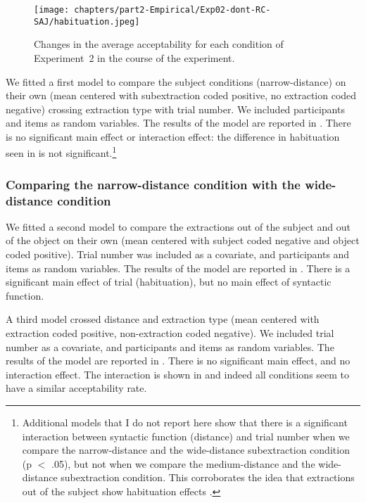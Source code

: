 \begin{figure}
    \centering
    \texttt{[image: chapters/part2-Empirical/Exp02-dont-RC-SAJ/habituation.jpeg]}
    \caption{Changes in the average acceptability for each condition of Experiment~2 in the course of the experiment.}
    \label{fig:exp02-habituation}
\end{figure}

We fitted a first model to compare the subject conditions (narrow-distance) on their own (mean centered with subextraction coded positive, no extraction coded negative) crossing extraction type with trial number. We included participants and items as random variables. The results of the model are reported in . 
There is no significant main effect or interaction effect: the difference in habituation seen in  is not significant.\footnote{Additional models that I do not report here show that there is a significant interaction between syntactic function (distance) and trial number when we compare the narrow-distance and the wide-distance subextraction condition (p $<$ .05), but not when we compare the medium-distance and the wide-distance subextraction condition. This corroborates the idea that extractions out of the subject show habituation effects \citep{Chaves.2019.Frequency}.}



\subsubsection{Comparing the narrow-distance condition with the wide-distance condition}

We fitted a second model to compare the extractions out of the subject and out of the object on their own (mean centered with subject coded negative and object coded positive). Trial number was included as a covariate, and participants and items as random variables. The results of the model are reported in . 
There is a significant main effect of trial (habituation), but no main effect of syntactic function.



A third model crossed distance and extraction type (mean centered with extraction coded positive, non-extraction coded negative). We included trial number as a covariate, and participants and items as random variables. The results of the model are reported in . 
There is no significant main effect, and no interaction effect. The interaction is shown in  and indeed all conditions seem to have a similar acceptability rate.

